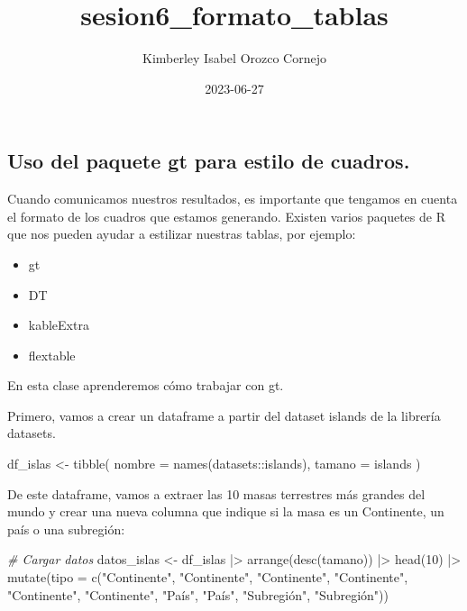 \documentclass[
]{article}
\title{sesion6\_formato\_tablas}
\author{Kimberley Isabel Orozco Cornejo}
\date{2023-06-27}
\newenvironment{Shaded}{\begin{snugshade}}{\end{snugshade}}
\newcommand{\AttributeTok}[1]{\textcolor[rgb]{0.77,0.63,0.00}{#1}}
\newcommand{\CommentTok}[1]{\textcolor[rgb]{0.56,0.35,0.01}{\textit{#1}}}
\newcommand{\DecValTok}[1]{\textcolor[rgb]{0.00,0.00,0.81}{#1}}
\newcommand{\FunctionTok}[1]{\textcolor[rgb]{0.00,0.00,0.00}{#1}}
\newcommand{\NormalTok}[1]{#1}
\newcommand{\OtherTok}[1]{\textcolor[rgb]{0.56,0.35,0.01}{#1}}
\newcommand{\SpecialCharTok}[1]{\textcolor[rgb]{0.00,0.00,0.00}{#1}}
\newcommand{\StringTok}[1]{\textcolor[rgb]{0.31,0.60,0.02}{#1}}
\providecommand{\tightlist}{%
  \setlength{\itemsep}{0pt}\setlength{\parskip}{0pt}}
\begin{document}
\maketitle

\hypertarget{uso-del-paquete-gt-para-estilo-de-cuadros.}{%
\subsection{Uso del paquete gt para estilo de
cuadros.}\label{uso-del-paquete-gt-para-estilo-de-cuadros.}}

Cuando comunicamos nuestros resultados, es importante que tengamos en
cuenta el formato de los cuadros que estamos generando. Existen varios
paquetes de R que nos pueden ayudar a estilizar nuestras tablas, por
ejemplo:

\begin{itemize}
\tightlist
\item
  gt
\item
  DT
\item
  kableExtra
\item
  flextable
\end{itemize}

En esta clase aprenderemos cómo trabajar con gt.

Primero, vamos a crear un dataframe a partir del dataset islands de la
librería datasets.

\begin{Shaded}
\begin{Highlighting}[]
\NormalTok{df\_islas }\OtherTok{\textless{}{-}} \FunctionTok{tibble}\NormalTok{(}
    \AttributeTok{nombre =} \FunctionTok{names}\NormalTok{(datasets}\SpecialCharTok{::}\NormalTok{islands),}
    \AttributeTok{tamano =}\NormalTok{ islands}
\NormalTok{  )}
\end{Highlighting}
\end{Shaded}

De este dataframe, vamos a extraer las 10 masas terrestres más grandes
del mundo y crear una nueva columna que indique si la masa es un
Continente, un país o una subregión:

\begin{Shaded}
\begin{Highlighting}[]
\CommentTok{\# Cargar datos}
\NormalTok{datos\_islas }\OtherTok{\textless{}{-}}\NormalTok{ df\_islas }\SpecialCharTok{|\textgreater{}} 
  \FunctionTok{arrange}\NormalTok{(}\FunctionTok{desc}\NormalTok{(tamano)) }\SpecialCharTok{|\textgreater{}} 
  \FunctionTok{head}\NormalTok{(}\DecValTok{10}\NormalTok{) }\SpecialCharTok{|\textgreater{}} 
  \FunctionTok{mutate}\NormalTok{(}\AttributeTok{tipo =} \FunctionTok{c}\NormalTok{(}\StringTok{"Continente"}\NormalTok{, }\StringTok{"Continente"}\NormalTok{, }\StringTok{"Continente"}\NormalTok{, }\StringTok{"Continente"}\NormalTok{, }\StringTok{"Continente"}\NormalTok{, }
                  \StringTok{"Continente"}\NormalTok{, }\StringTok{"País"}\NormalTok{, }\StringTok{"País"}\NormalTok{, }\StringTok{"Subregión"}\NormalTok{, }\StringTok{"Subregión"}\NormalTok{))}
\end{Highlighting}
\end{Shaded}
\end{document}
